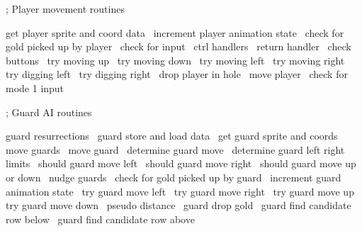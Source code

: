 \documentclass[10pt]{report}%
\begin{document}
    ; Player movement routines

    \LA{}get player sprite and coord data~{\nwtagstyle{}}\RA{}
    \LA{}increment player animation state~{\nwtagstyle{}}\RA{}
    \LA{}check for gold picked up by player~{\nwtagstyle{}}\RA{}
    \LA{}check for input~{\nwtagstyle{}}\RA{}
    \LA{}ctrl handlers~{\nwtagstyle{}}\RA{}
    \LA{}return handler~{\nwtagstyle{}}\RA{}
    \LA{}check buttons~{\nwtagstyle{}}\RA{}
    \LA{}try moving up~{\nwtagstyle{}}\RA{}
    \LA{}try moving down~{\nwtagstyle{}}\RA{}
    \LA{}try moving left~{\nwtagstyle{}}\RA{}
    \LA{}try moving right~{\nwtagstyle{}}\RA{}
    \LA{}try digging left~{\nwtagstyle{}}\RA{}
    \LA{}try digging right~{\nwtagstyle{}}\RA{}
    \LA{}drop player in hole~{\nwtagstyle{}}\RA{}
    \LA{}move player~{\nwtagstyle{}}\RA{}
    \LA{}check for mode 1 input~{\nwtagstyle{}}\RA{}

    ; Guard AI routines

    \LA{}guard resurrections~{\nwtagstyle{}}\RA{}
    \LA{}guard store and load data~{\nwtagstyle{}}\RA{}
    \LA{}get guard sprite and coords~{\nwtagstyle{}}\RA{}
    \LA{}move guards~{\nwtagstyle{}}\RA{}
    \LA{}move guard~{\nwtagstyle{}}\RA{}
    \LA{}determine guard move~{\nwtagstyle{}}\RA{}
    \LA{}determine guard left right limits~{\nwtagstyle{}}\RA{}
    \LA{}should guard move left~{\nwtagstyle{}}\RA{}
    \LA{}should guard move right~{\nwtagstyle{}}\RA{}
    \LA{}should guard move up or down~{\nwtagstyle{}}\RA{}
    \LA{}nudge guards~{\nwtagstyle{}}\RA{}
    \LA{}check for gold picked up by guard~{\nwtagstyle{}}\RA{}
    \LA{}increment guard animation state~{\nwtagstyle{}}\RA{}
    \LA{}try guard move left~{\nwtagstyle{}}\RA{}
    \LA{}try guard move right~{\nwtagstyle{}}\RA{}
    \LA{}try guard move up~{\nwtagstyle{}}\RA{}
    \LA{}try guard move down~{\nwtagstyle{}}\RA{}
    \LA{}pseudo distance~{\nwtagstyle{}}\RA{}
    \LA{}guard drop gold~{\nwtagstyle{}}\RA{}
    \LA{}guard find candidate row below~{\nwtagstyle{}}\RA{}
    \LA{}guard find candidate row above~{\nwtagstyle{}}\RA{}
\end{document}
